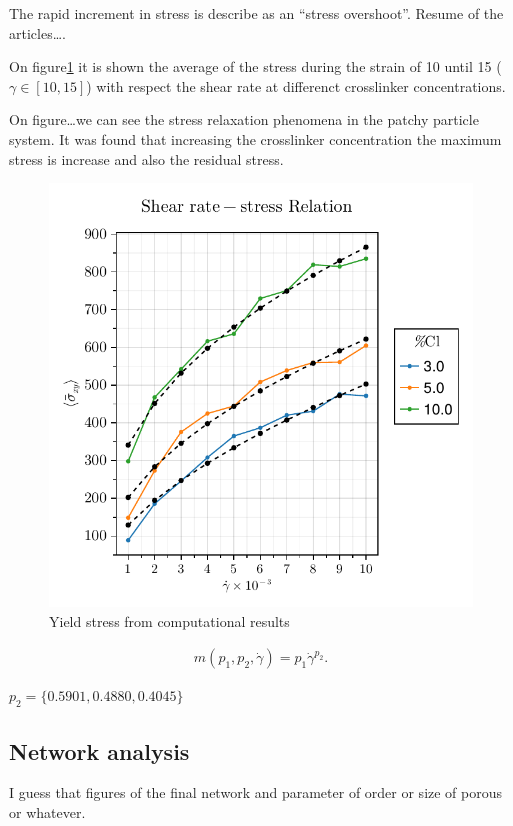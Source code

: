The rapid increment in stress is describe as an ``stress overshoot''.
Resume of the articles\ldots.

On figure\ref{fig:yieldStressResults} it is shown the average of the stress during the strain of \num{10} until \num{15} ($\gamma\in[10,15]$) with respect the shear rate at differenct crosslinker concentrations.

On figure\ldots we can see the stress relaxation phenomena in the patchy particle system.
It was found that increasing the crosslinker concentration the maximum stress is increase and also the residual stress.

\newpage



\begin{figure}[ht!]
    \centering
    \includegraphics[width=\textwidth]{figs/ComputaitonalResults/yieldStress.pdf}
    \caption{Yield stress from computational results}\label{fig:yieldStressResults}
\end{figure}

\begin{gather}
    m(p_1,p_2,\dot{\gamma}) = p_1\dot{\gamma}^{p_2}.
\end{gather}

$p_2 = \{0.5901,0.4880,0.4045\}$

\subsection{Network analysis}

I guess that figures of the final network and parameter of order or size of porous or whatever.

